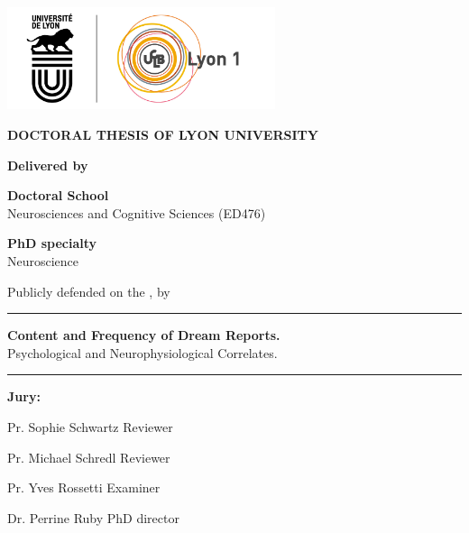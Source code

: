 \begin{titlepage}

  \setlength{\parindent}{0pt}
  \thispagestyle{empty}

  \begin{center}
  \includegraphics[height=3cm]{content/logo}
  \end{center}

  \vfill

  \begin{center}
  \fontsize{14pt}{16pt}\selectfont
  \textbf{\uppercase{DOCTORAL THESIS OF LYON UNIVERSITY}} \par


  \fontsize{12pt}{14pt}\selectfont
  \textbf{Delivered by}\\
  \thesisUniversity


  \textbf{Doctoral School}\\
  Neurosciences and Cognitive Sciences (ED476)


  \textbf{PhD specialty}\\
  Neuroscience


  Publicly defended on the \thesisDate, by\\
  \fontsize{14pt}{16pt}\selectfont
  \textbf{\thesisName}

  \rule{\textwidth}{0.1pt}

  \fontsize{20pt}{24pt}\selectfont
  \textbf{Content and Frequency of Dream Reports.}\\
  \fontsize{18pt}{22pt}\selectfont
  Psychological and Neurophysiological Correlates.

  \rule{\textwidth}{0.1pt}

  \end{center}

  \fontsize{12pt}{14pt}\selectfont
  \textbf{Jury:}

  \fontsize{11pt}{13pt}\selectfont

  Pr. Sophie Schwartz  	\hfill Reviewer

  Pr. Michael Schredl 	\hfill Reviewer

  Pr. Yves Rossetti 	\hfill Examiner

  Dr. Perrine Ruby 		\hfill PhD director


  \vfill

  \newpage

\end{titlepage}
